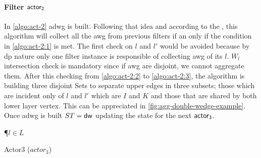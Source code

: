 \paragraph{Filter $\mathsf{actor_2}$} In \autoref{algo:act-2} \acrshort{adwg} is built. Following that idea and according to the , this algorithm will collect all the \acrshort{awg} 
from previous filters if an only if the condition in \autoref{algo:act-2:1} is met. The first check on $l$ and $l'$ would be avoided because by \acrshort{dp} nature
only one filter instance is responsible of collecting \acrshort{awg} of its $l$. $W_l$ intersection check is mandatory since if \acrshort{awg} are disjoint, we cannot aggregate them.
After this checking from \autoref{algo:act-2:2} to \autoref{algo:act-2:3}, the algorithm is building three disjoint Sets to separate upper edges in three subsets; those which are incident only of 
$l$ and $l'$ which are $I$ and $K$ and those that are shared by both lower layer vertex. This can be appreciated in \autoref{fig:agg-double-wedge-example}.
Once \acrshort{adwg} is built $ST = \mathsf{dw}$ updating the state for the next $\mathsf{actor_3}$.

\begin{algorithm}
\DontPrintSemicolon
{}
\SetAlgoRefName{[A7]}
\P{$l \in L$}
\FS{$\dwi \subseteq \dw$}
\BlankLine
{}
\PC{$|\ati| \geq 1 \lor \fid$}
\caption{Actor3 ($actor_3$)}
\label{algo:act-3}
\end{algorithm}

